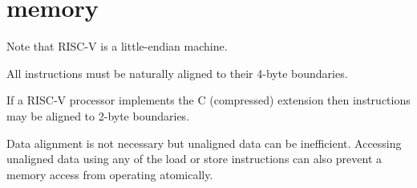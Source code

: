 \section{memory}

Note that RISC-V is a little-endian machine.

All instructions must be naturally aligned to their 4-byte
boundaries.~\cite[p.~5]{rvismv1v22:2017}

If a RISC-V processor implements the C (compressed) extension then
instructions may be aligned to 2-byte
boundaries.\cite[p.~68]{rvismv1v22:2017}

Data alignment is not necessary but unaligned data can be inefficient.
Accessing unaligned data using any of the load or store instructions can
also prevent a memory access from operating
atomically.~\cite[p.19]{rvismv1v22:2017}



%